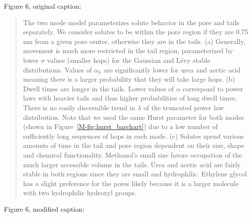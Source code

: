 \documentclass{article}
\begin{document}
\begin{enumerate}[label={Comment \theenumi :}, leftmargin=3.9\parindent]
\begin{quote}
		\end{quote}
		
		Figure 6, original caption:
	 
	    \begin{quote}

		  The two mode model parameterizes solute behavior in the pore and tails
	      separately. We consider solutes to be within the pore region if they
	      are 0.75 nm from a given pore center, otherwise they are in the
	      tails. (a) Generally, movement is much more restricted in the tail
	      region, parameterized by lower $\sigma$ values (smaller hops) for the
	      Gaussian and L\'evy stable distributions. Values of $\alpha_h$ are
	      significantly lower for urea and acetic acid meaning there is a
	      larger probability that they will take large hops. (b) Dwell times
	      are longer in the tails. Lower values of $\alpha$ correspond to power
	      laws with heavier tails and thus higher probabilities of long dwell
	      times. There is no easily discernible trend in $\lambda$ of the
	      truncated power law distribution. Note that we used the same Hurst
	      parameter for both modes (shown in Figure~\ref{M-fig:hurst_barchart})
	      due to a low number of sufficiently long sequences of hops in each
	      mode. (c) Solutes spend various amounts of time in the tail and pore
	      region dependent on their size, shape and chemical functionality.
	      Methanol's small size favors occupation of the much larger accessible
	      volume in the tails. Urea and acetic acid are fairly stable in both
	      regions since they are small and hydrophilic. Ethylene glycol has a
	      slight preference for the pores likely because it is a larger
	      molecule with two hydrophilic hydroxyl groups.
	  
        \end{quote}
	
	    Figure 6, modified caption:
	 

\end{enumerate}
\end{document}
